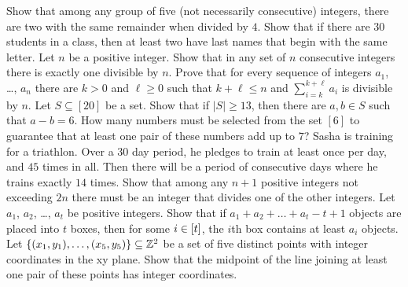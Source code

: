 \begin{chapterendexercises}
  \exercise Show that among any group of five (not necessarily consecutive)
    integers, there are two with the same remainder when divided by $4$.
  \exercise Show that if there are 30 students in a class, then at least
    two have last names that begin with the same letter.
  \exercise Let $n$ be a positive integer. Show that in any set of $n$
    consecutive integers there is exactly one divisible by $n$.
  \exercise[recommended] Prove that for every sequence of integers $a_1$, \dots,
    $a_n$ there are $k > 0$ and $\ell \ge 0$ such that $k + \ell \le n$ and
    $\sum_{i = k}^{k + \ell} a_i$ is divisible by $n$.
  \exercise[recommended] Let $S \subseteq [20]$ be a set. Show that if
    $|S| \ge 13$, then there are $a, b \in S$ such that $a - b = 6$.
  \exercise How many numbers must be selected from the set $[6]$ to
    guarantee that at least one pair of these numbers add up to $7$?
  \exercise Sasha is training for a triathlon. Over a $30$ day period, he
    pledges to train at least once per day, and $45$ times in all. Then there
    will be a period of consecutive days where he trains exactly $14$ times.
  \exercise Show that among any $n + 1$ positive integers not exceeding $2n$
    there must be an integer that divides one of the other integers.
  \exercise[recommended] Let $a_1$, $a_2$, \dots, $a_t$ be positive integers. Show that
    if $a_1 + a_2 + \dots + a_t - t + 1$ objects are placed into $t$ boxes,
    then for some $i \in {[{t}]}$, the $i$th box contains at least $a_i$ objects.
  \exercise Let $\set{(x_1,y_1), \dots, (x_5, y_5)} \subseteq \Z^2$ be a
    set of five distinct points with integer coordinates in the xy plane. Show
    that the midpoint of the line joining at least one pair of these points has
    integer coordinates.
\end{chapterendexercises}
